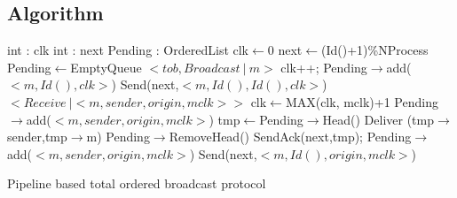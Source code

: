 \documentclass[a4paper]{article}
\begin{document}
\subsection{Algorithm}
\begin{algorithm}[H]
    \centering
    \begin{algorithmic}[5]
        \Data
        \State int : clk
        \State int : next
        \State Pending : OrderedList
        \EndData
        \Init
        \State clk$\gets$0
        \State next$\gets$(Id()+1)\%NProcess
        \State Pending$\gets$EmptyQueue
        \EndInit
        \Event $< tob,Broadcast\ |\ m> $
        \State clk++;
        \State Pending$\rightarrow$add($<m,Id(), clk>$) 
        \State Send(next,$<m,Id(),Id(),clk>$)
        \Else
        \EndIf
        \EndEvent
        \Event $<Receive\ | <m,sender, origin, mclk>>$
        \State clk$\gets$MAX(clk, mclk)+1
        \State Pending$\rightarrow$add($<m,sender,origin,mclk>$)
        \State tmp$\gets$Pending$\rightarrow$Head()
        \State Deliver (tmp$\rightarrow$sender,tmp$\rightarrow$m)
        \State Pending$\rightarrow$RemoveHead()
        \EndWhile
        \State SendAck(next,tmp);
        \EndIf
        \Else
        \State Pending$\rightarrow$add($<m,sender,origin,mclk>$)
        \State Send(next,$<m,Id(),origin,mclk>$)
        \EndIf
        \EndEvent
    \end{algorithmic}
    \caption{Pipeline based total ordered broadcast protocol}
\end{algorithm}
\end{document}
